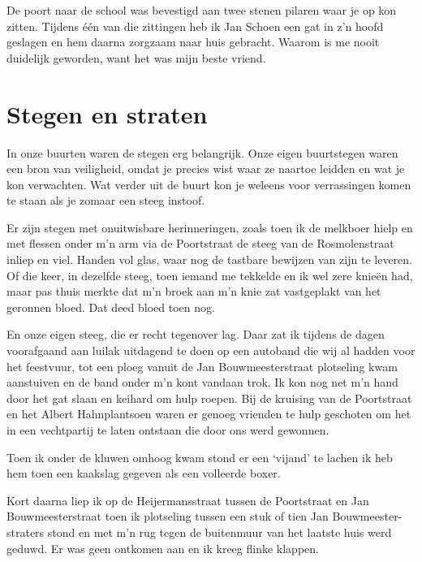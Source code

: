 \documentclass[12pt,twoside, openright]{memoir}
\begin{document}
De poort naar de school was bevestigd aan twee stenen pilaren waar je op kon zitten. Tijdens één van die zittingen heb ik Jan Schoen een gat in z’n hoofd geslagen en hem daarna zorgzaam naar huis gebracht. Waarom is me nooit duidelijk geworden, want het was mijn beste vriend. 

\section*{Stegen en straten} %
\label{cha:stegen_straten}

In onze buurten waren de stegen erg belangrijk. Onze eigen buurtstegen waren een bron van veiligheid, omdat je precies wist waar ze naartoe leidden en wat je kon verwachten. Wat verder uit de buurt kon je weleens voor verrassingen komen te staan als je zomaar een steeg instoof. 

Er zijn stegen met onuitwisbare herinneringen, zoals toen ik de melkboer hielp en met flessen onder m’n arm via de Poortstraat de steeg van de Rosmolenstraat inliep en viel. Handen vol glas, waar nog de tastbare bewijzen van zijn te leveren. Of die keer, in dezelfde steeg, toen iemand me tekkelde en ik wel zere knieën had, maar pas thuis merkte dat m’n broek aan m’n knie zat vastgeplakt van het geronnen bloed. Dat deed bloed toen nog.

En onze eigen steeg, die er recht tegenover lag. Daar zat ik tijdens de dagen voorafgaand aan luilak uitdagend te doen op een autoband die wij al hadden voor het feestvuur, tot een ploeg vanuit de Jan Bouwmeesterstraat plotseling kwam aanstuiven en de band onder m’n kont vandaan trok. Ik kon nog net m’n hand door het gat slaan en keihard om hulp roepen. Bij de kruising van de Poortstraat en het Albert Hahnplantsoen waren er genoeg vrienden te hulp geschoten om het in een vechtpartij te laten ontstaan die door ons werd gewonnen. 

Toen ik onder de kluwen omhoog kwam stond er een ‘vijand’ te lachen ik heb hem toen een kaakslag gegeven als een volleerde boxer.

Kort daarna liep ik op de Heijermansstraat tussen de Poortstraat en Jan Bouwmeesterstraat toen ik plotseling tussen een stuk of tien Jan Bouwmeester-straters stond en met m’n rug tegen de buitenmuur van het laatste huis werd geduwd. Er was geen ontkomen aan en ik kreeg flinke klappen. 
\end{document}
